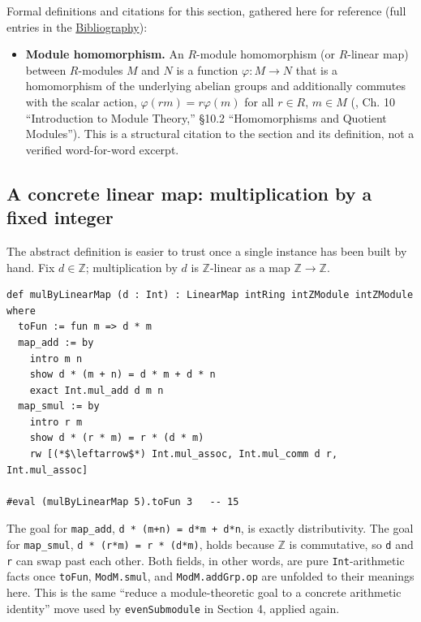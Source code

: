 Formal definitions and citations for this section, gathered here for reference (full entries in the \hyperref[sec:root:bibliography:1]{Bibliography}):

\begin{itemize}
\tightlist
\item
  \textbf{Module homomorphism.} An \(R\)-module homomorphism (or \(R\)-linear map) between \(R\)-modules \(M\) and \(N\) is a function \(\varphi : M \to N\) that is a homomorphism of the underlying abelian groups and additionally commutes with the scalar action, \(\varphi(rm) = r\varphi(m)\) for all \(r \in R\), \(m \in M\) (\cite{DummitFoote2003}, Ch. 10 ``Introduction to Module Theory,'' §10.2 ``Homomorphisms and Quotient Modules''). This is a structural citation to the section and its definition, not a verified word-for-word excerpt.
\end{itemize}

\subsection{A concrete linear map: multiplication by a fixed integer}\label{sec:11-modules:05-linear-maps:3}

The abstract definition is easier to trust once a single instance has been built by hand. Fix \(d \in \mathbb{Z}\); multiplication by \(d\) is \(\mathbb{Z}\)-linear as a map \(\mathbb{Z} \to \mathbb{Z}\).

\begin{lstlisting}
def mulByLinearMap (d : Int) : LinearMap intRing intZModule intZModule where
  toFun := fun m => d * m
  map_add := by
    intro m n
    show d * (m + n) = d * m + d * n
    exact Int.mul_add d m n
  map_smul := by
    intro r m
    show d * (r * m) = r * (d * m)
    rw [(*$\leftarrow$*) Int.mul_assoc, Int.mul_comm d r, Int.mul_assoc]

#eval (mulByLinearMap 5).toFun 3   -- 15
\end{lstlisting}

The goal for \texttt{map\_\allowbreak{}add}, \texttt{d * (m+n) = d*m + d*n}, is exactly distributivity. The goal for \texttt{map\_\allowbreak{}smul}, \texttt{d * (r*m) = r * (d*m)}, holds because \(\mathbb{Z}\) is commutative, so \texttt{d} and \texttt{r} can swap past each other. Both fields, in other words, are pure \texttt{Int}-arithmetic facts once \texttt{toFun}, \texttt{ModM.smul}, and \texttt{ModM.addGrp.op} are unfolded to their meanings here. This is the same ``reduce a module-theoretic goal to a concrete arithmetic identity'' move used by \texttt{evenSubmodule} in Section 4, applied again.

